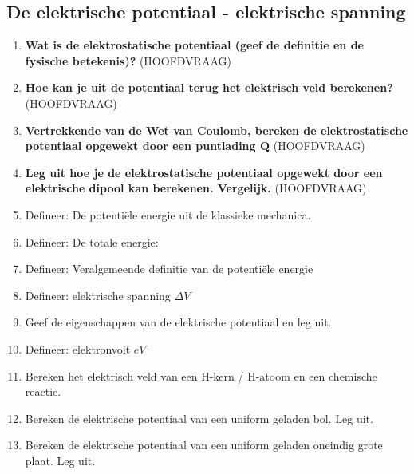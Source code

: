 \documentclass[a4paper,12pt]{article}
\begin{document}
    \subsection{De elektrische potentiaal - elektrische spanning}
    \begin{enumerate}
        \item \textbf{Wat is de elektrostatische potentiaal (geef de definitie en de fysische betekenis)?} (HOOFDVRAAG)
        \item \textbf{Hoe kan je uit de potentiaal terug het elektrisch veld berekenen?} (HOOFDVRAAG)
        \item \textbf{Vertrekken­de van de Wet van Coulomb, bereken de elektrostatische potentiaal opgewekt door een punt­lading Q} (HOOFDVRAAG)
        \item \textbf{Leg uit hoe je de elektrostatische potentiaal opgewekt door een elektrische dipool kan berekenen. Vergelijk.  } (HOOFDVRAAG)
        \item Defineer: De potentiële energie uit de klassieke mechanica.
        \item Defineer: De totale energie:
        \item Defineer: Veralgemeende definitie van de potentiële energie
        \item Defineer: elektrische spanning $\Delta V$
        \item Geef de eigenschappen van de elektrische potentiaal en leg uit.
        \item Defineer: elektronvolt $eV$
        \item Bereken het elektrisch veld van een H-kern / H-atoom en een chemische reactie.
        \item Bereken de elektrische potentiaal van een uniform geladen bol. Leg uit.
        \item Bereken de elektrische potentiaal van een uniform geladen oneindig grote plaat. Leg uit.
    \end{enumerate}
\end{document}
